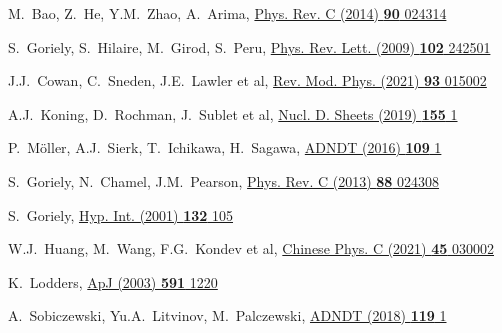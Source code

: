 \begin{thebibliography}{9}
M.~Bao, Z.~He, Y.M.~Zhao, A.~Arima,
\href{https://doi.org/10.1103/PhysRevC.90.024314}
  {Phys. Rev. C (2014) \textbf{90} 024314}

S.~Goriely, S.~Hilaire, M.~Girod, S.~Peru,
\href{https://doi.org/10.1103/PhysRevLett.102.242501}
  {Phys. Rev. Lett. (2009) \textbf{102} 242501}

J.J.~Cowan, C.~Sneden, J.E.~Lawler et al,
\href{https://doi.org/10.1103/RevModPhys.93.015002}{Rev. Mod. Phys. (2021) \textbf{93} 015002}

A.J.~Koning, D.~Rochman, J.~Sublet et al,
\href{https://doi.org/10.1016/j.nds.2019.01.002}
  {Nucl. D. Sheets (2019) \textbf{155} 1}


P.~Möller, A.J.~Sierk, T.~Ichikawa, H.~Sagawa,
\href{https://doi.org/10.1016/j.adt.2015.10.002}
  {ADNDT (2016) \textbf{109} 1}

S.~Goriely, N.~Chamel, J.M.~Pearson,
\href{https://doi.org/10.1103/PhysRevC.82.035804}
  {Phys. Rev. C (2013) \textbf{88} 024308}

S.~Goriely,
\href{http://dx.doi.org/10.1023/A:1011929318210}
  {Hyp. Int. (2001) \textbf{132} 105}

W.J.~Huang, M.~Wang, F.G.~Kondev et al,
\href{https://doi.org/10.1088/1674-1137/abddb0}{Chinese Phys. C (2021) \textbf{45} 030002}

K.~Lodders,
\href{https://doi.org/10.1086/375492}{ApJ (2003) \textbf{591} 1220}

A.~Sobiczewski, Yu.A.~Litvinov, M.~Palczewski, 
\href{https://doi.org/10.1016/j.adt.2017.05.001}{ADNDT (2018) \textbf{119} 1}


\end{thebibliography}
